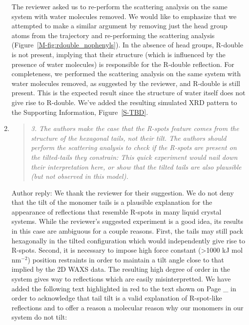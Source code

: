 \documentclass{article}
\begin{document}
\begin{enumerate}
    The reviewer asked us to re-perform the scattering analysis on the same
    system with water molecules removed. We would like to emphasize that we
    attempted to make a similar argument by removing just the head group atoms from
    the trajectory and re-performing the scattering analysis
    (Figure~\ref{M-fig:rdouble_nophenyls}). In the absence of head groups, R-double
    is not present, implying that their structure (which is influenced by the
    presence of water molecules) is responsible for the R-double reflection. For
    completeness, we performed the scattering analysis on the same system with
    water molecules removed, as suggested by the reviewer, and R-double is still
    present. This is the expected result since the structure of water itself does
    not give rise to R-double. We've added the resulting simulated XRD pattern to
    the Supporting Information, Figure~\ref{S-TBD}. 
   
    \item \begin{quote}
    \textit{3. The authors make the case that the R-spots feature comes from the structure of the hexagonal
    tails, not their tilt. The authors should perform the scattering analysis to check if the R-spots are
    present on the tilted-tails they constrain: This quick experiment would nail down their interpretation
    here, or show that the tilted tails are also plausible (but not observed in this model).}
    \end{quote}

    Author reply: We thank the reviewer for their suggestion. We do not deny
    that the tilt of the monomer tails is a plausible explanation for the
    appearance of reflections that resemble R-spots in many liquid crystal systems.
    While the reviewer's suggested experiment is a good idea, its results in this
    case are ambiguous for a couple reasons. First, the tails may still pack
    hexagonally in the tilted configuration which would independently give rise to
    R-spots. Second, it is necessary to impose high force constant (>1000 kJ mol
    nm$^{-2}$) position restraints in order to maintain a tilt angle close to that
    implied by the 2D WAXS data. The resulting high degree of order in the system 
    gives way to reflections which are easily misinterpretted. We have added the
    following text highlighted in red to the text shown on Page _ in order to
    acknowledge that tail tilt is a valid explanation of R-spot-like reflections 
    and to offer a reason a molecular reason why our monomers in our system do not
    tilt: 
 

\end{enumerate}
\end{document}
